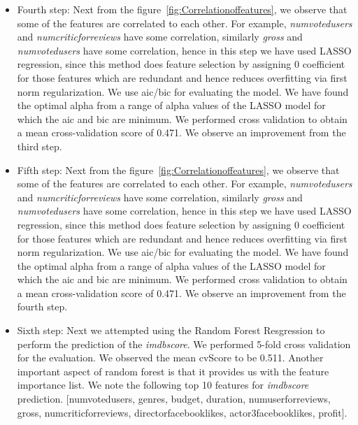 \documentclass{article}%
\begin{document}
\begin{itemize}
\item Fourth step: Next from the figure~\ref{fig:Correlationoffeatures}, we observe that some of the features are correlated to each other. For example, \textit{numvotedusers} and \textit{numcriticforreviews} have some correlation, similarly \textit{gross} and \textit{numvotedusers} have some correlation, hence in this step we have used LASSO regression, since this method does feature selection by assigning 0 coefficient for those features which are redundant and hence reduces overfitting via first norm regularization. We use aic/bic for evaluating the model. We have found the optimal alpha from a range of alpha values of the LASSO model for which the aic and bic are minimum. We performed cross validation to obtain a mean cross-validation score of 0.471. We observe an improvement from the third step.
\end{itemize}

\begin{itemize}
\item Fifth step: Next from the figure~\ref{fig:Correlationoffeatures}, we observe that some of the features are correlated to each other. For example, \textit{numvotedusers} and \textit{numcriticforreviews} have some correlation, similarly \textit{gross} and \textit{numvotedusers} have some correlation, hence in this step we have used LASSO regression, since this method does feature selection by assigning 0 coefficient for those features which are redundant and hence reduces overfitting via first norm regularization. We use aic/bic for evaluating the model. We have found the optimal alpha from a range of alpha values of the LASSO model for which the aic and bic are minimum. We performed cross validation to obtain a mean cross-validation score of 0.471. We observe an improvement from the fourth step.
\end{itemize}

\begin{itemize}
\item Sixth step: Next we attempted using the Random Forest Resgression to perform the prediction of the \textit{imdbscore}. We performed 5-fold cross validation for the evaluation. We observed the mean cvScore to be 0.511. Another important aspect of random forest is that it provides us with the feature importance list. We note the following top 10 features for \textit{imdbscore} prediction. [numvotedusers, genres, budget, duration, numuserforreviews, gross, numcriticforreviews, directorfacebooklikes, actor3facebooklikes, profit]. 
\end{itemize}
\end{document}
